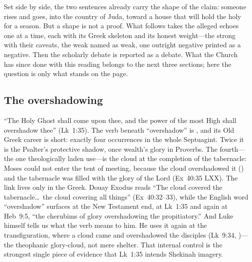 Set side by side, the two sentences already carry the shape of the claim:
someone rises and goes, into the country of Juda, toward a house that will
hold the holy for a season. But a shape is not a proof. What follows takes
the alleged echoes one at a time, each with its Greek skeleton and its
honest weight---the strong with their caveats, the weak named as weak, one
outright negative printed as a negative. Then the scholarly debate is
reported as a debate. What the Church has since done with this reading
belongs to the next three sections; here the question is only what stands
on the page.

\par\noindent
\begin{minipage}{\linewidth}

\end{minipage}\par

\subsection{The overshadowing}

``The Holy Ghost shall come upon thee, and the power of the most High shall
overshadow thee'' (Lk~1:35). The verb beneath ``overshadow'' is
, and its Old Greek career is short: exactly four
occurrences in the whole Septuagint. Twice it is the Psalter's protective
shadow, once wealth's glory in Proverbs. The fourth---the one
theologically laden use---is the cloud at the completion of the
tabernacle: Moses could not enter the tent of meeting, because the cloud
overshadowed it () and the
tabernacle was filled with the glory of the Lord (Ex~40:35 LXX). The link
lives only in the Greek. Douay Exodus reads ``The cloud covered the
tabernacle\ldots\ the cloud covering all things'' (Ex~40:32--33), while
the English word ``overshadow'' surfaces at the New Testament end, at
Lk~1:35 and again at Heb~9:5, ``the cherubims of glory overshadowing the
propitiatory.'' And Luke
himself tells us what the verb means to him. He uses it again at the
transfiguration, where a cloud came and overshadowed the disciples
(Lk~9:34, )---the theophanic
glory-cloud, not mere shelter. That internal control is the strongest
single piece of evidence that Lk~1:35 intends Shekinah imagery.

